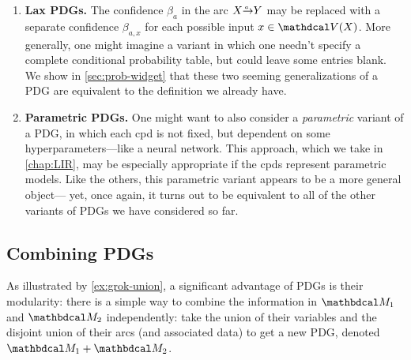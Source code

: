 \begin{enumerate}[wide, label={\textbf{PDG Variant \arabic{*}:}}]
    \item 
    \textbf{Lax PDGs.}
    The confidence $\beta_a$ in the arc $\ed aXY$ may be replaced with a separate confidence $\beta_{a,x}$ for each possible input $x \in \V(X)$. 
    More generally, one might imagine a variant in which one needn't specify a complete conditional probability table, but could leave some entries blank. 
    We show in \cref{sec:prob-widget} that these two seeming generalizations of a PDG are equivalent to the definition we already have. 

    \item 
    \textbf{Parametric PDGs.}
    One might want to also consider a \emph{parametric} variant of a PDG,
		 in which each cpd is not fixed, but dependent on some hyper\-parameters---like a neural network. 
    This approach, which we take in \cref{chap:LIR}, 
		may be especially appropriate if the cpds represent parametric models.
    Like the others, this parametric variant appears to be a more general object---%
	yet, once again, it turns out to be equivalent to all of the other variants of PDGs we have considered so far. 
\end{enumerate}

\subsection{Combining PDGs}

%
%
As illustrated by \cref{ex:grok-union}, a significant advantage of PDGs is their modularity:
there is a simple way to combine the information in $\dg M_1$ and $\dg M_2$ 
independently: take the union of their variables and the disjoint union of their arcs (and associated data) to get a new PDG, denoted $\dg M_1 + \dg M_2$.

